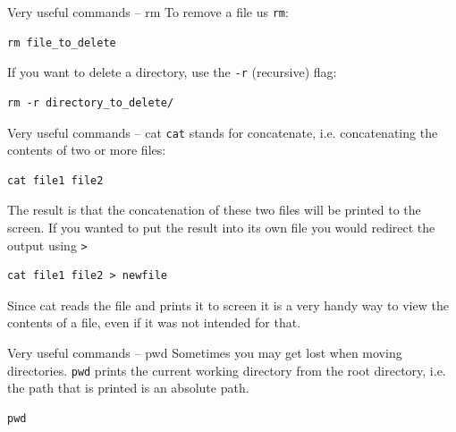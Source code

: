 \documentclass[10pt]{beamer}
\begin{document}
\begin{frame}[label={sec:org721176c},fragile]{Very useful commands -- rm}
 To remove a file us \texttt{rm}:

\begin{verbatim}
rm file_to_delete
\end{verbatim}

If you want to delete a directory, use the \texttt{-r} (recursive) flag:

\begin{verbatim}
rm -r directory_to_delete/
\end{verbatim}
\end{frame}

\begin{frame}[label={sec:org81e58a7},fragile]{Very useful commands -- cat}
 \texttt{cat} stands for concatenate, i.e. concatenating the contents of two or more
files:

\begin{verbatim}
cat file1 file2
\end{verbatim}

The result is that the concatenation of these two files will be printed to the
screen. If you wanted to put the result into its own file you would redirect the
output using \texttt{>}

\begin{verbatim}
cat file1 file2 > newfile
\end{verbatim}

Since cat reads the file and prints it to screen it is a very handy way to view
the contents of a file, even if it was not intended for that.
\end{frame}

\begin{frame}[label={sec:org1d0ae5e},fragile]{Very useful commands -- pwd}
 Sometimes you may get lost when moving directories. \texttt{pwd} prints the current
working directory from the root directory, i.e. the path that is printed is an
absolute path.

\begin{verbatim}
pwd
\end{verbatim}
\end{frame}
\end{document}
